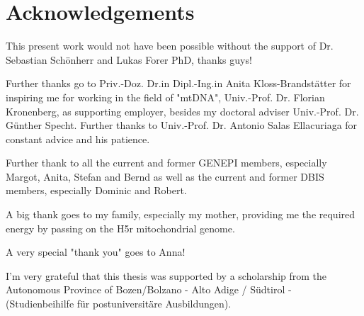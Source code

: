 \section*{Acknowledgements}


This present work would not have been possible without the support of Dr. Sebastian Sch\"onherr and Lukas Forer PhD, thanks guys! 

Further thanks go to Priv.-Doz. Dr.in Dipl.-Ing.in Anita Kloss-Brandst\"atter for inspiring me for working in the field of "mtDNA", Univ.-Prof. Dr. Florian Kronenberg, as supporting employer, besides my doctoral adviser Univ.-Prof. Dr. G\"unther Specht. Further thanks to Univ.-Prof. Dr. Antonio Salas Ellacuriaga for constant advice and his patience.

Further thank to all the current and former GENEPI members, especially Margot, Anita, Stefan and Bernd as well as the current and former DBIS members, especially Dominic and Robert.

A big thank goes to my family, especially my mother, providing me the required energy by passing on the H5r mitochondrial genome. 

A very special "thank you" goes to Anna! 

I'm very grateful that this thesis was supported by a scholarship from the Autonomous Province of Bozen/Bolzano - Alto Adige / S\"udtirol - (Studienbeihilfe f\"ur postuniversit\"are Ausbildungen). 

 
%
\cleardoublepage
